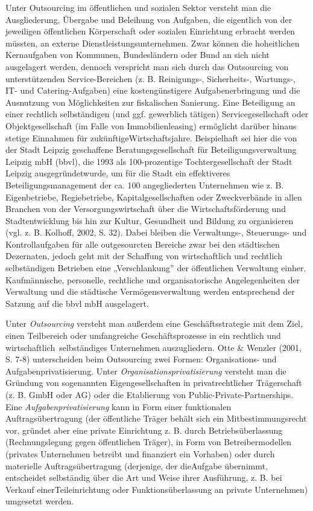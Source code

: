 \documentclass[
  letterpaper,
]{book}
\begin{document}
Unter Outsourcing im öffentlichen und sozialen Sektor versteht man die
Ausgliederung, Übergabe und Beleihung von Aufgaben, die eigentlich von
der jeweiligen öffentlichen Körperschaft oder sozialen Einrichtung
erbracht werden müssten, an externe Dienstleistungsunternehmen. Zwar
können die hoheitlichen Kernaufgaben von Kommunen, Bundesländern oder
Bund an sich nicht ausgelagert werden, dennoch verspricht man sich durch
das Outsourcing von unterstützenden Service-Bereichen (z. B.
Reinigungs-, Sicherheits-, Wartungs-, IT- und Catering-Aufgaben) eine
kostengünstigere Aufgabenerbringung und die Ausnutzung von Möglichkeiten
zur fiskalischen Sanierung. Eine Beteiligung an einer rechtlich
selbständigen (und ggf. gewerblich tätigen) Servicegesellschaft oder
Objektgesellschaft (im Falle von Immobilienleasing) ermöglicht darüber
hinaus stetige Einnahmen für zukünftigeWirtschaftsjahre. Beispielhaft
sei hier die von der Stadt Leipzig geschaffene Beratungsgesellschaft für
Beteiligungsverwaltung Leipzig mbH (bbvl), die 1993 als 100-prozentige
Tochtergesellschaft der Stadt Leipzig ausgegründetwurde, um für die
Stadt ein effektiveres Beteiligungsmanagement der ca. 100 angegliederten
Unternehmen wie z. B. Eigenbetriebe, Regiebetriebe,
Kapitalgesellschaften oder Zweckverbände in allen Branchen von der
Versorgungswirtschaft über die Wirtschaftsförderung und Stadtentwicklung
bis hin zur Kultur, Gesundheit und Bildung zu organisieren (vgl. z. B.
Kolhoff, 2002, S. 32). Dabei bleiben die Verwaltungs-, Steuerungs- und
Kontrollaufgaben für alle outgesourcten Bereiche zwar bei den
städtischen Dezernaten, jedoch geht mit der Schaffung von wirtschaftlich
und rechtlich selbständigen Betrieben eine „Verschlankung'' der
öffentlichen Verwaltung einher. Kaufmännische, personelle, rechtliche
und organisatorische Angelegenheiten der Verwaltung und die städtische
Vermögensverwaltung werden entsprechend der Satzung auf die bbvl mbH
ausgelagert.

Unter \emph{Outsourcing }versteht man außerdem eine Geschäftsstrategie
mit dem Ziel, einen Teilbereich oder umfangreiche Geschäftsprozesse in
ein rechtlich und wirtschaftlich~selbständiges Unternehmen
auszugliedern. Otte \& Wenzler (2001, S. 7-8) unterscheiden beim
Outsourcing zwei Formen: Organisations- und Aufgabenprivatisierung.
Unter \emph{Organisationsprivatisierung }versteht man die Gründung von
sogenannten Eigengesellschaften in privatrechtlicher Trägerschaft (z. B.
GmbH oder AG) oder die Etablierung von Public-Private-Partnerships. Eine
\emph{Aufgabenprivatisierung }kann in Form einer funktionalen
Auftragsübertragung (der öffentliche Träger behält sich ein
Mitbestimmungsrecht vor, gründet aber eine private Einrichtung z. B.
durch Betriebsüberlassung (Rechnungslegung gegen öffentlichen Träger),
in Form von Betreibermodellen (privates Unternehmen betreibt und
finanziert ein Vorhaben) oder durch materielle Auftragsübertragung
(derjenige, der dieAufgabe übernimmt, entscheidet selbständig über die
Art und Weise ihrer Ausführung, z. B. bei Verkauf einerTeileinrichtung
oder Funktionsüberlassung an private Unternehmen) umgesetzt werden.
\end{document}
